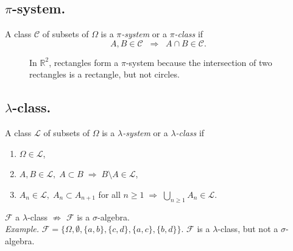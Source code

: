 \documentclass[11pt]{article}
\theoremstyle{definition}
\begin{document}
\subsection{$\pi$-system.}
\label{subsec:measures:pi-system} A class $\mathcal{C}$ of subsets of $\Omega$ is a \emph{$\pi$-system} or a \emph{$\pi$-class} if
\[
A, B \in \mathcal{C} \;\;\Rightarrow\;\; A \cap B \in \mathcal{C}.
\]
\begin{figure}[htbp]
  \centering

  \centering
  \caption{In $\mathbb{R}^2$, rectangles form a $\pi$-system because the intersection of two rectangles is a rectangle, but not circles.}
  \label{fig:rectangles-pi-system}
\end{figure}


\subsection{$\lambda$-class.}
\label{subsec:measures:lambda-class} A class $\mathcal{L}$ of subsets of $\Omega$ is a \emph{$\lambda$-system} or a \emph{$\lambda$-class} if
\begin{enumerate}
  \item[(i)] $\Omega \in \mathcal{L}$,
  \item[(ii)] $A,B \in \mathcal{L},\; A \subset B \;\Rightarrow\; B \setminus A \in \mathcal{L}$,
  \item[(iii)] $A_n \in \mathcal{L},\; A_n \subset A_{n+1}$ for all $n \geq 1 \;\Rightarrow\; \bigcup_{n \geq 1} A_n \in \mathcal{L}$.
\end{enumerate}
$\mathcal{F}$ a $\lambda$-class $\nRightarrow$ $\mathcal{F}$ is a $\sigma$-algebra.
\\
\emph{Example.} $\mathcal{F} = \{\Omega, \emptyset, \{a,b\}, \{c,d\}, \{a, c\}, \{b, d\} \}.$ $\mathcal{F}$ is a $\lambda$-class, but not a $\sigma$-algebra. 
\end{document}
